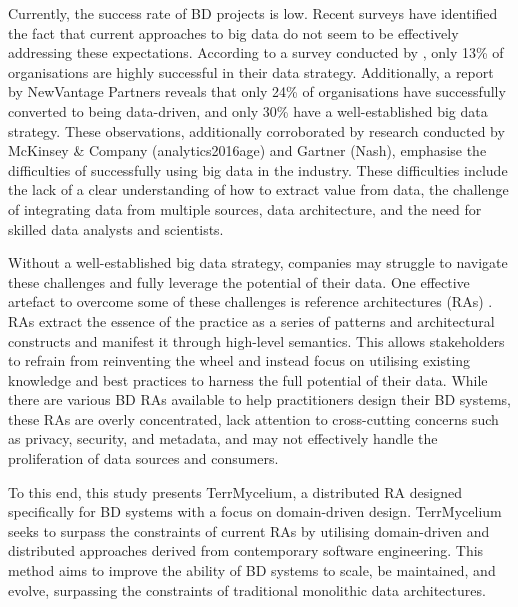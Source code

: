 \documentclass[journal]{IEEEtran}
\begin{document}
Currently, the success rate of BD projects is low. Recent surveys have identified the fact that current approaches to big data do not seem to be effectively addressing these expectations. According to a survey conducted by \cite{DataBricksSurvey}, only 13\% of organisations are highly successful in their data strategy. Additionally, a report by NewVantage Partners reveals that only 24\% of organisations have successfully converted to being data-driven, and only 30\% have a well-established big data strategy. These observations, additionally corroborated by research conducted by McKinsey \& Company (analytics2016age) and Gartner (Nash), emphasise the difficulties of successfully using big data in the industry. These difficulties include the lack of a clear understanding of how to extract value from data, the challenge of integrating data from multiple sources, data architecture, and the need for skilled data analysts and scientists. 

Without a well-established big data strategy, companies may struggle to navigate these challenges and fully leverage the potential of their data. One effective artefact to overcome some of these challenges is reference architectures (RAs) \cite{Cloutier2010}. RAs extract the essence of the practice as a series of patterns and architectural constructs and manifest it through high-level semantics. This allows stakeholders to refrain from reinventing the wheel and instead focus on utilising existing knowledge and best practices to harness the full potential of their data. While there are various BD RAs available to help practitioners design their BD systems, these RAs are overly concentrated, lack attention to cross-cutting concerns such as privacy, security, and metadata, and may not effectively handle the proliferation of data sources and consumers.

To this end, this study presents TerrMycelium, a distributed RA designed specifically for BD systems with a focus on domain-driven design. TerrMycelium seeks to surpass the constraints of current RAs by utilising domain-driven and distributed approaches derived from contemporary software engineering. This method aims to improve the ability of BD systems to scale, be maintained, and evolve, surpassing the constraints of traditional monolithic data architectures.
\end{document}
